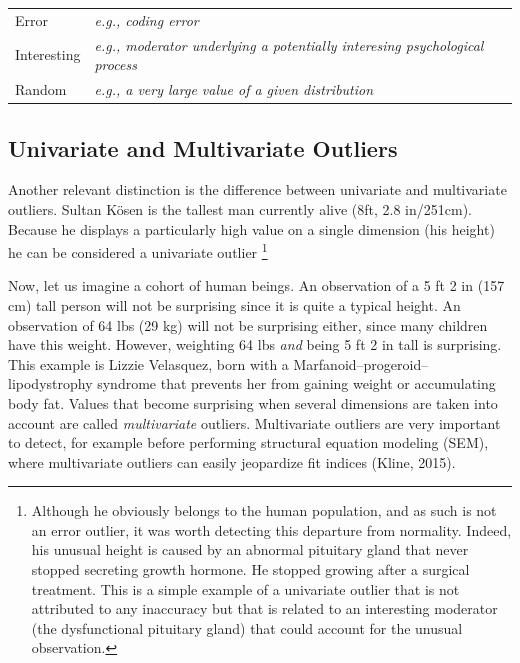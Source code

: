 \documentclass[man,floatsintext]{apa6}
\let\rmarkdownfootnote\footnote%
\def\footnote{\protect\rmarkdownfootnote}
\begin{document}
\begin{longtable}[]{@{}ll@{}}
\toprule
\endhead
\begin{minipage}[t]{0.15\columnwidth}\raggedright
Error\strut
\end{minipage} & \begin{minipage}[t]{0.79\columnwidth}\raggedright
\emph{e.g., coding error}\strut
\end{minipage}\tabularnewline
\begin{minipage}[t]{0.15\columnwidth}\raggedright
Interesting\strut
\end{minipage} & \begin{minipage}[t]{0.79\columnwidth}\raggedright
\emph{e.g., moderator underlying a potentially interesing psychological process}\strut
\end{minipage}\tabularnewline
\begin{minipage}[t]{0.15\columnwidth}\raggedright
Random\strut
\end{minipage} & \begin{minipage}[t]{0.79\columnwidth}\raggedright
\emph{e.g., a very large value of a given distribution}\strut
\end{minipage}\tabularnewline
\bottomrule
\end{longtable}

\hypertarget{univariate-and-multivariate-outliers}{%
\subsection{Univariate and Multivariate Outliers}\label{univariate-and-multivariate-outliers}}

Another relevant distinction is the difference between univariate and multivariate outliers. Sultan Kösen is the tallest man currently alive (8ft, 2.8 in/251cm). Because he displays a particularly high value on a single dimension (his height) he can be considered a univariate outlier \footnote{Although he obviously belongs to the human population, and as such is not an error outlier, it was worth detecting this departure from normality. Indeed, his unusual height is caused by an abnormal pituitary gland that never stopped secreting growth hormone. He stopped growing after a surgical treatment. This is a simple example of a univariate outlier that is not attributed to any inaccuracy but that is related to an interesting moderator (the dysfunctional pituitary gland) that could account for the unusual observation.}

Now, let us imagine a cohort of human beings. An observation of a 5 ft 2 in (157 cm) tall person will not be surprising since it is quite a typical height. An observation of 64 lbs (29 kg) will not be surprising either, since many children have this weight. However, weighting 64 lbs \emph{and} being 5 ft 2 in tall is surprising. This example is Lizzie Velasquez, born with a Marfanoid--progeroid--lipodystrophy syndrome that prevents her from gaining weight or accumulating body fat. Values that become surprising when several dimensions are taken into account are called \emph{multivariate} outliers. Multivariate outliers are very important to detect, for example before performing structural equation modeling (SEM), where multivariate outliers can easily jeopardize fit indices (Kline, 2015).
\end{document}
